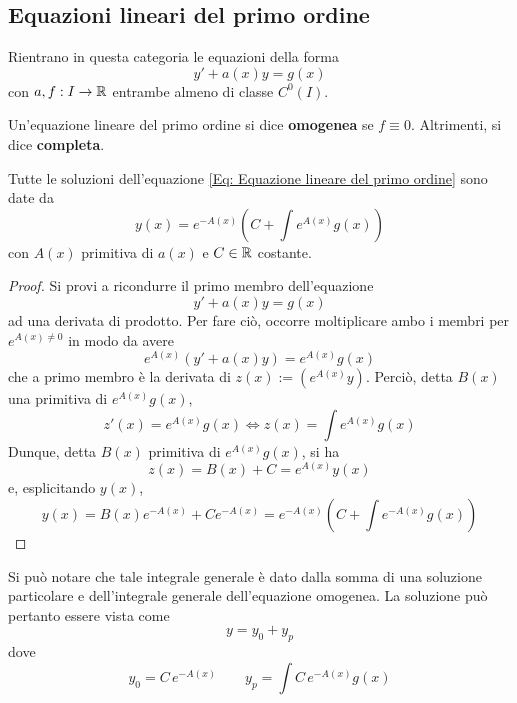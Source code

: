 \subsection{Equazioni lineari del primo ordine}
Rientrano in questa categoria le equazioni della forma
\begin{equation} \label{Eq: Equazione lineare del primo ordine}
    y'+ a(x) y = g(x)
\end{equation}
con $a,f: I \to \mathbb{R}$ entrambe almeno di classe $C^0(I)$.\\
\begin{definition}
    Un'equazione lineare del primo ordine si dice \textbf{omogenea} se $f \equiv 0$. Altrimenti, si dice \textbf{completa}.
\end{definition}
\begin{theorem} \label{Teo: Integrale generale delle ode lineare del primo ordine}
    Tutte le soluzioni dell'equazione \eqref{Eq: Equazione lineare del primo ordine} sono date da
    \begin{equation}
        y(x)=e^{-A(x)}\left(C+ \int{e^{A(x)}g(x)}\right)
    \end{equation}
    con $A(x)$ primitiva di $a(x)$ e $C \in \mathbb{R}$ costante.
\end{theorem}
\begin{proof} 
Si provi a ricondurre il primo membro  dell'equazione 
\begin{equation}
    y'+ a(x) y = g(x)
\end{equation}
ad una derivata di prodotto. Per fare ciò, occorre moltiplicare ambo i membri per $e^{A(x) \neq 0}$ in modo da avere
\begin{equation}
    e^{A(x)}(y'+a(x)y)= e^{A(x)}g(x)
\end{equation}
che a primo membro è la derivata di $z(x):=\left(e^{A(x)}y \right)$. Perciò, detta $B(x)$ una primitiva di $e^{A(x)}g(x)$,
\begin{equation}
    z'(x)= e^{A(x)}g(x) \iff z(x)=\int e^{A(x)}g(x)
\end{equation}
Dunque, detta $B(x)$ primitiva di $e^{A(x)}g(x)$, si ha
\begin{equation}
 z(x)= B(x)+C= e^{A(x)}y(x)
 \end{equation}
 e, esplicitando $y(x)$,
 \begin{equation}
    y(x)= B(x) e^{-A(x)} + C{e^{-A(x)}} = e^{-A(x)}\left( C + \int e^{-A(x)}g(x) \right)
 \end{equation}
\end{proof}
Si può notare che tale integrale generale è dato dalla somma di una soluzione particolare e dell'integrale generale dell'equazione omogenea. La soluzione può pertanto essere vista come
\begin{equation}
    y=y_0+ y_p
\end{equation}
dove
\begin{equation}
    y_0= C\, e^{-A(x)} \qquad y_p= \int C\, e^{-A(x)}g(x)
\end{equation}
